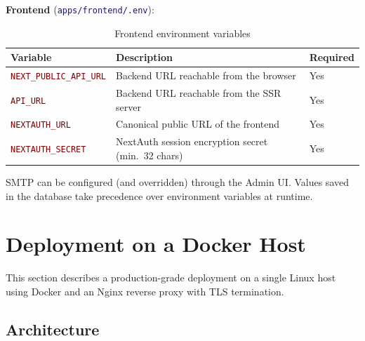 \documentclass[12pt,a4paper,twoside]{report}
\newcommand{\notebox}[1]{\begin{tcolorbox}[noteboxstyle]#1\end{tcolorbox}}
\newcommand{\file}[1]{\texttt{\textcolor{MidnightBlue}{#1}}}
\newcommand{\env}[1]{\texttt{\textcolor{Maroon}{#1}}}
\begin{document}
\textbf{Frontend} (\file{apps/frontend/.env}):

\begin{table}[H]
  \centering
  \caption{Frontend environment variables}
  \begin{tabularx}{\linewidth}{@{}l>{\raggedright\arraybackslash}Xl@{}}
    \toprule
    \textbf{Variable} & \textbf{Description} & \textbf{Required} \\
    \midrule
    \env{NEXT\_PUBLIC\_API\_URL} & Backend URL reachable from the browser        & Yes \\
    \env{API\_URL}               & Backend URL reachable from the SSR server     & Yes \\
    \env{NEXTAUTH\_URL}          & Canonical public URL of the frontend          & Yes \\
    \env{NEXTAUTH\_SECRET}       & NextAuth session encryption secret (min.\ 32 chars) & Yes \\
    \bottomrule
  \end{tabularx}
\end{table}

\notebox{SMTP can be configured (and overridden) through the Admin UI.
Values saved in the database take precedence over environment variables
at runtime.}

\section{Deployment on a Docker Host}
\label{sec:docker-deploy}

This section describes a production-grade deployment on a single Linux
host using Docker and an Nginx reverse proxy with TLS termination.

\subsection*{Architecture}
\end{document}

